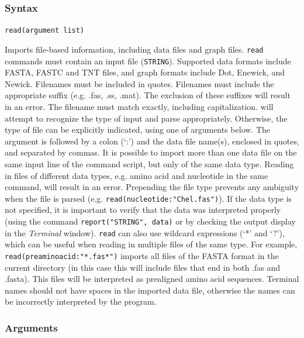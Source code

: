 	\subsubsection{Syntax}
		\texttt{read(argument list)}
			
	\begin{phygdescription}
		{Imports file-based information, including data files and graph files. \texttt{read} 
		commands must contain an input file (\texttt{STRING}). Supported data formats 
		include FASTA, FASTC and TNT files, and graph formats include Dot, Enewick, %
		and Newick. Filenames must be included in quotes. Filenames must include the 
		appropriate suffix (e.g. .fas, .ss, .mat). The exclusion of these suffixes will result 
		in an error. The filename must match exactly, including capitalization. \phyg will 
		attempt to recognize the type of input and parse appropriately. Otherwise, the 
		type of file can be explicitly indicated, using one of arguments below. The argument 
		is followed by a colon (`:') and the data file name(s), enclosed in quotes, and 
		separated by commas. It is possible to import more than one data file on the 
		same input line of the command script, but only of the same data type. Reading 
		in files of different data types, e.g. amino acid and nucleotide in the same command, 
		will result in an error. Prepending the file type prevents any ambiguity when the file is parsed
		(e.g. \texttt{read(nucleotide:"Chel.fas")}). If the data type is not specified, it is 
		important to verify that the data was interpreted properly (using the command 
		\texttt{report("STRING", data)} or by checking the output display in the 
		\textit{Terminal} window). \texttt{read} can also use wildcard expressions 
		(`*' and `?'), which can be useful when reading in multiple files of the 
		same type. For example, \texttt{read(preaminoacid:"*.fas*")} imports all files of the 
		FASTA format in the current directory (in this case this will include files that end 
		in both .fas and .fasta). This files will be interpreted as prealigned amino acid
		sequences. Terminal names should not have spaces in the imported 
		data file, otherwise the names can be incorrectly interpreted by the program.} 
	\end{phygdescription}

	\subsubsection{Arguments}
	
